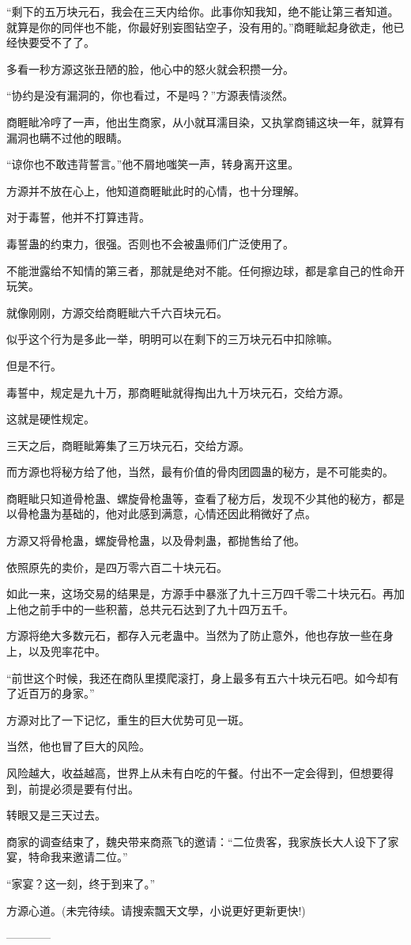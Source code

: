 \begin{this_body}
“剩下的五万块元石，我会在三天内给你。此事你知我知，绝不能让第三者知道。就算是你的同伴也不能，你最好别妄图钻空子，没有用的。”商睚眦起身欲走，他已经快要受不了了。

多看一秒方源这张丑陋的脸，他心中的怒火就会积攒一分。

“协约是没有漏洞的，你也看过，不是吗？”方源表情淡然。

商睚眦冷哼了一声，他出生商家，从小就耳濡目染，又执掌商铺这块一年，就算有漏洞也瞒不过他的眼睛。

“谅你也不敢违背誓言。”他不屑地嗤笑一声，转身离开这里。

方源并不放在心上，他知道商睚眦此时的心情，也十分理解。

对于毒誓，他并不打算违背。

毒誓蛊的约束力，很强。否则也不会被蛊师们广泛使用了。

不能泄露给不知情的第三者，那就是绝对不能。任何擦边球，都是拿自己的性命开玩笑。

就像刚刚，方源交给商睚眦六千六百块元石。

似乎这个行为是多此一举，明明可以在剩下的三万块元石中扣除嘛。

但是不行。

毒誓中，规定是九十万，那商睚眦就得掏出九十万块元石，交给方源。

这就是硬性规定。

三天之后，商睚眦筹集了三万块元石，交给方源。

而方源也将秘方给了他，当然，最有价值的骨肉团圆蛊的秘方，是不可能卖的。

商睚眦只知道骨枪蛊、螺旋骨枪蛊等，查看了秘方后，发现不少其他的秘方，都是以骨枪蛊为基础的，他对此感到满意，心情还因此稍微好了点。

方源又将骨枪蛊，螺旋骨枪蛊，以及骨刺蛊，都抛售给了他。

依照原先的卖价，是四万零六百二十块元石。

如此一来，这场交易的结果是，方源手中暴涨了九十三万四千零二十块元石。再加上他之前手中的一些积蓄，总共元石达到了九十四万五千。

方源将绝大多数元石，都存入元老蛊中。当然为了防止意外，他也存放一些在身上，以及兜率花中。

“前世这个时候，我还在商队里摸爬滚打，身上最多有五六十块元石吧。如今却有了近百万的身家。”

方源对比了一下记忆，重生的巨大优势可见一斑。

当然，他也冒了巨大的风险。

风险越大，收益越高，世界上从未有白吃的午餐。付出不一定会得到，但想要得到，前提必须是要有付出。

转眼又是三天过去。

商家的调查结束了，魏央带来商燕飞的邀请：“二位贵客，我家族长大人设下了家宴，特命我来邀请二位。”

“家宴？这一刻，终于到来了。”

方源心道。(未完待续。请搜索飄天文學，小说更好更新更快!)

------------

\end{this_body}

